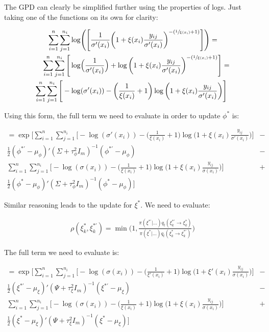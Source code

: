\documentclass{article}
\begin{document}
The GPD can clearly be simplified further using the properties of logs. Just taking one of the functions on its own for clarity:

\begin{align*}
\sum_{i=1}^n \sum_{j=1}^{n_i} \log & \Bigg( \Bigg[ \frac{1}{\sigma'(x_i)} \bigg( 1 + \xi(x_i) \frac{y_{ij}}{\sigma'(x_i)} \bigg)^{-(\sfrac{1}{\xi(x_i)} + 1)} \Bigg] \Bigg) = \\
\sum_{i=1}^n \sum_{j=1}^{n_i} \Bigg[ \log & \Big( \frac{1}{\sigma'(x_i)} \Big) + \log \bigg( 1 + \xi(x_i) \frac{y_{ij}}{\sigma'(x_i)} \bigg)^{-(\sfrac{1}{\xi(x_i)} + 1)} \Bigg] = \\
\sum_{i=1}^n \sum_{j=1}^{n_i} \Bigg[ - \log & (\sigma'(x_i)) - \bigg( \frac{1}{\xi(x_i)} + 1 \bigg) \log \bigg( 1 + \xi(x_i) \frac{y_{ij}}{\sigma'(x_i)} \bigg) \Bigg]
\end{align*}

Using this form, the full term we need to evaluate in order to update $\phi^*$ is:

\begin{align}
= \exp \Bigg[ \sum_{i=1}^n \sum_{j=1}^{n_i} \bigg[ - \log (\sigma'(x_i)) - \bigg( \frac{1}{\xi(x_i)} + 1 \bigg) \log \bigg( 1 + \xi(x_i) \frac{y_{ij}}{\sigma'(x_i)} \bigg) \bigg] & - \nonumber \\
\frac{1}{2} (\phi^{*'} - \mu_\phi)' (\Sigma + \tau^2_\phi I_m)^{-1} (\phi^{*'} - \mu_\phi) & - \nonumber \\
\sum_{i=1}^n \sum_{j=1}^{n_i} \bigg[ - \log (\sigma(x_i)) - \bigg( \frac{1}{\xi(x_i)} + 1 \bigg) \log \bigg( 1 + \xi(x_i) \frac{y_{ij}}{\sigma(x_i)} \bigg) \bigg] & + \nonumber \\
\frac{1}{2} (\phi^{*} - \mu_\phi)' (\Sigma + \tau^2_\phi I_m)^{-1} (\phi^{*} - \mu_\phi) \Bigg] & \label{eq:1a}
\end{align}

Similar reasoning leads to the update for $\xi^*$. We need to evaluate:

\begin{align*}
\rho(\xi^{*}_k, \xi^{*'}_k) = \min \bigg (1, \frac{\pi(\xi^{*'} | \dots ) q_t(\xi^{*'}_k \to \xi^{*}_k)}{ \pi(\xi^{*} | \dots ) q_t(\xi^{*}_k \to \xi^{*'}_k) } \bigg)
\end{align*}

The full term we need to evaluate is:

\begin{align}
= \exp \Bigg[ \sum_{i=1}^n \sum_{j=1}^{n_i} \bigg[ - \log (\sigma(x_i)) - \bigg( \frac{1}{\xi'(x_i)} + 1 \bigg) \log \bigg( 1 + \xi'(x_i) \frac{y_{ij}}{\sigma(x_i)} \bigg) \bigg] & -\nonumber \\
\frac{1}{2} (\xi^{*'} - \mu_\xi)' (\Psi + \tau^2_\xi I_m)^{-1} (\xi^{*'} - \mu_\xi) & - \nonumber \\
\sum_{i=1}^n \sum_{j=1}^{n_i} \bigg[ - \log (\sigma(x_i)) - \bigg( \frac{1}{\xi(x_i)} + 1 \bigg) \log \bigg( 1 + \xi(x_i) \frac{y_{ij}}{\sigma(x_i)} \bigg) \bigg] & +\nonumber \\
\frac{1}{2} (\xi^{*} - \mu_\xi)' (\Psi + \tau^2_\xi I_m)^{-1} (\xi^{*} - \mu_\xi) \Bigg] & \label{eq:1b}
\end{align}
\end{document}
